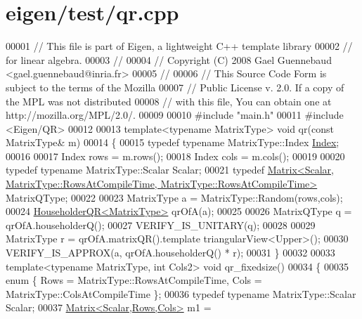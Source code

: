 \hypertarget{eigen_2test_2qr_8cpp_source}{}\section{eigen/test/qr.cpp}
\label{eigen_2test_2qr_8cpp_source}

\begin{DoxyCode}
00001 \textcolor{comment}{// This file is part of Eigen, a lightweight C++ template library}
00002 \textcolor{comment}{// for linear algebra.}
00003 \textcolor{comment}{//}
00004 \textcolor{comment}{// Copyright (C) 2008 Gael Guennebaud <gael.guennebaud@inria.fr>}
00005 \textcolor{comment}{//}
00006 \textcolor{comment}{// This Source Code Form is subject to the terms of the Mozilla}
00007 \textcolor{comment}{// Public License v. 2.0. If a copy of the MPL was not distributed}
00008 \textcolor{comment}{// with this file, You can obtain one at http://mozilla.org/MPL/2.0/.}
00009 
00010 \textcolor{preprocessor}{#include "main.h"}
00011 \textcolor{preprocessor}{#include <Eigen/QR>}
00012 
00013 \textcolor{keyword}{template}<\textcolor{keyword}{typename} MatrixType> \textcolor{keywordtype}{void} qr(\textcolor{keyword}{const} MatrixType& m)
00014 \{
00015   \textcolor{keyword}{typedef} \textcolor{keyword}{typename} MatrixType::Index \hyperlink{namespace_eigen_a62e77e0933482dafde8fe197d9a2cfde}{Index};
00016 
00017   Index rows = m.rows();
00018   Index cols = m.cols();
00019 
00020   \textcolor{keyword}{typedef} \textcolor{keyword}{typename} MatrixType::Scalar Scalar;
00021   \textcolor{keyword}{typedef} 
      \hyperlink{group___core___module_class_eigen_1_1_matrix}{Matrix<Scalar, MatrixType::RowsAtCompileTime, MatrixType::RowsAtCompileTime>}
       MatrixQType;
00022 
00023   MatrixType a = MatrixType::Random(rows,cols);
00024   \hyperlink{group___q_r___module}{HouseholderQR<MatrixType>} qrOfA(a);
00025 
00026   MatrixQType q = qrOfA.householderQ();
00027   VERIFY\_IS\_UNITARY(q);
00028 
00029   MatrixType r = qrOfA.matrixQR().template triangularView<Upper>();
00030   VERIFY\_IS\_APPROX(a, qrOfA.householderQ() * r);
00031 \}
00032 
00033 \textcolor{keyword}{template}<\textcolor{keyword}{typename} MatrixType, \textcolor{keywordtype}{int} Cols2> \textcolor{keywordtype}{void} qr\_fixedsize()
00034 \{
00035   \textcolor{keyword}{enum} \{ Rows = MatrixType::RowsAtCompileTime, Cols = MatrixType::ColsAtCompileTime \};
00036   \textcolor{keyword}{typedef} \textcolor{keyword}{typename} MatrixType::Scalar Scalar;
00037   \hyperlink{group___core___module_class_eigen_1_1_matrix}{Matrix<Scalar,Rows,Cols>} m1 = 

\end{DoxyCode}
